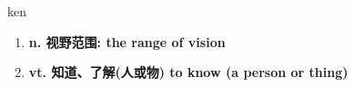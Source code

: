 
\begin{frame}
{\huge ken}
\begin{center}
\begin{enumerate}\Large
  \item \textbf{n. 视野范围: the range of vision}
  \item \textbf{vt. 知道、了解(人或物) to know (a person or thing)}
\end{enumerate}
\end{center}
\end{frame}
